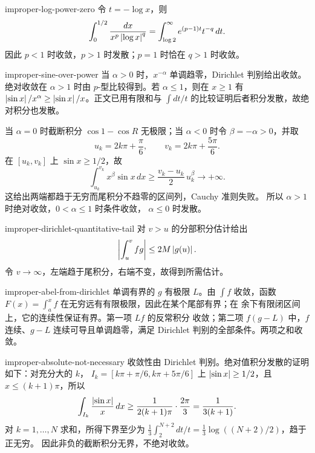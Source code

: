 \begin{solution}{improper-log-power-zero}
令 \(t=-\log x\)，则
\[
 \int_0^{1/2}\frac{dx}{x^p\left|\log x\right|^{q}}
 =\int_{\log2}^{\infty}e^{(p-1)t}t^{-q}\,dt.
\]
因此 \(p<1\) 时收敛，\(p>1\) 时发散；\(p=1\) 时恰在 \(q>1\)
时收敛。
\end{solution}

\begin{solution}{improper-sine-over-power}
当 \(\alpha>0\) 时，\(x^{-\alpha}\) 单调趋零，Dirichlet 判别给出收敛。
绝对收敛在 \(\alpha>1\) 时由 \(p\)-型比较得到。若
\(\alpha\le1\)，则在 \(x\ge1\) 有
\(\left|\sin x\right|/x^\alpha\ge\left|\sin x\right|/x\)。正文已用有限和与
\(\int dt/t\) 的比较证明后者积分发散，故绝对积分也发散。

当 \(\alpha=0\) 时截断积分 \(\cos1-\cos R\) 无极限；当
\(\alpha<0\) 时令 \(\beta=-\alpha>0\)，并取
\[
 u_k=2k\pi+\frac{\pi}{6},\qquad
 v_k=2k\pi+\frac{5\pi}{6}.
\]
在 \([u_k,v_k]\) 上 \(\sin x\ge1/2\)，故
\[
 \int_{u_k}^{v_k}x^\beta\sin x\,dx
 \ge\frac{v_k-u_k}{2}\,u_k^\beta\longrightarrow+\infty.
\]
这给出两端都趋于无穷而尾积分不趋零的区间列，Cauchy 准则失败。
所以 \(\alpha>1\) 时绝对收敛，\(0<\alpha\le1\) 时条件收敛，
\(\alpha\le0\) 时发散。
\end{solution}

\begin{solution}{improper-dirichlet-quantitative-tail}
对 \(v>u\) 的分部积分估计给出
\[
 \left|\int_u^vfg\right|\le2M\left|g(u)\right|.
\]
令 \(v\to\infty\)，左端趋于尾积分，右端不变，故得到所需估计。
\end{solution}

\begin{solution}{improper-abel-from-dirichlet}
单调有界的 \(g\) 有极限 \(L\)。由 \(\int f\) 收敛，函数
\(F(x)=\int_a^x f\) 在无穷远有有限极限，因此在某个尾部有界；在
余下有限闭区间上，它的连续性保证有界。第一项 \(Lf\) 的反常积分
收敛；第二项 \(f(g-L)\) 中，\(f\) 连续、\(g-L\) 连续可导且单调趋零，满足
Dirichlet 判别的全部条件。两项之和收敛。
\end{solution}

\begin{solution}{improper-absolute-not-necessary}
收敛性由 Dirichlet 判别。绝对值积分发散的证明如下：对充分大的 \(k\)，
\(I_k=[k\pi+\pi/6,k\pi+5\pi/6]\) 上
\(\left|\sin x\right|\ge1/2\)，且 \(x\le(k+1)\pi\)，所以
\[
 \int_{I_k}\frac{\left|\sin x\right|}x\,dx
 \ge \frac{1}{2(k+1)\pi}\cdot\frac{2\pi}{3}
 =\frac1{3(k+1)}.
\]
对 \(k=1,\ldots,N\) 求和，所得下界至少为
\(\frac13\int_2^{N+2}dt/t=\frac13\log((N+2)/2)\)，趋于正无穷。
因此非负的截断积分无界，不绝对收敛。
\end{solution}

